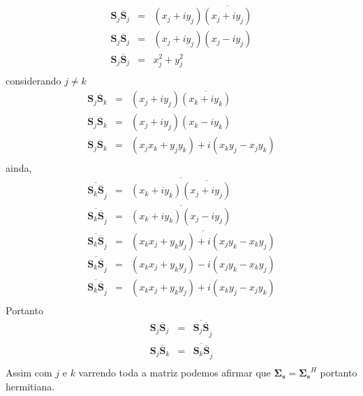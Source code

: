 \begin{equation}\label{eqn3}
\begin{array}{ccc}
\mathbf{S}_j\overline{\mathbf{S}}_j&=& (x_j+iy_j)\overline{(x_j+iy_j)} \\
\mathbf{S}_j\overline{\mathbf{S}}_j&=& (x_j+iy_j)(x_j-iy_j) \\
\mathbf{S}_j\overline{\mathbf{S}}_j&=& x_j^2+y_j^2 \\
\end{array}
\end{equation}
considerando $j \neq k$
\begin{equation}\label{eqn4}
\begin{array}{ccc}
\mathbf{S}_j\overline{\mathbf{S}}_k&=& (x_j+iy_j)\overline{(x_k+iy_k)} \\
\mathbf{S}_j\overline{\mathbf{S}}_k&=& (x_j+iy_j)(x_k-iy_k) \\
\mathbf{S}_j\overline{\mathbf{S}}_k&=& (x_jx_k+y_jy_k)+i(x_ky_j-x_jy_k) \\
\end{array}
\end{equation}
ainda,
\begin{equation}\label{eqn5}
\begin{array}{ccc}
	\overline{\mathbf{S}_k\overline{\mathbf{S}}}_j&=&\overline{ (x_k+iy_k)\overline{(x_j+iy_j)} }\\
	\overline{\mathbf{S}_k\overline{\mathbf{S}}}_j&=&\overline{ (x_k+iy_k)(x_j-iy_j)} \\
	\overline{\mathbf{S}_k\overline{\mathbf{S}}}_j&=&\overline{ (x_kx_j+y_ky_j)+i(x_jy_k-x_ky_j) }\\
	\overline{\mathbf{S}_k\overline{\mathbf{S}}}_j&=&(x_kx_j+y_ky_j)-i(x_jy_k-x_ky_j) \\
	\overline{\mathbf{S}_k\overline{\mathbf{S}}}_j&=&(x_kx_j+y_ky_j)+i(x_ky_j-x_jy_k) \\
\end{array}
\end{equation}
Portanto
\begin{equation}\label{eqn6}
\begin{array}{ccc}
	\mathbf{S}_j\overline{\mathbf{S}}_j&=&\overline{\mathbf{S}_j\overline{\mathbf {S}}}_j \\
	\mathbf{S}_j\overline{\mathbf{S}}_k&=&\overline{\mathbf{S}_k\overline{\mathbf {S}}}_j \\
\end{array}
\end{equation}
Assim com $j$ e $k$ varrendo toda a matriz podemos afirmar que $\mathbf{\Sigma_{\mathbf{s}}}=\mathbf{\Sigma_{ s}}^H$ portanto hermitiana.


